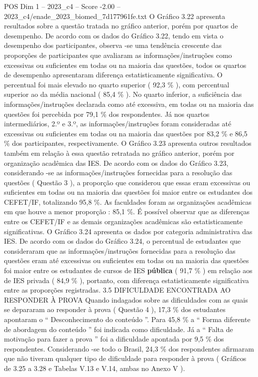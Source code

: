 \begin{textsample}{POS Dim 1 – 2023\_c4 – Score -2.00 – 2023\_c4/enade\_2023\_biomed\_7d177961fe.txt}
O Gráfico 3.22 apresenta resultados sobre a questão tratada no gráfico anterior, porém por quartos de desempenho.
De acordo com os dados do Gráfico 3.22, tendo em vista o desempenho dos participantes, observa -se uma tendência crescente das proporções de participantes que avaliaram as informações/instruções como excessivas ou suficientes em todas ou na maioria das questões, todos os quartos de desempenho apresentaram diferença estatisticamente significativa.
O percentual foi mais elevado no quarto superior ( 92,3 \% ), com percentual superior ao da média nacional ( 85,4 \% ).
No quarto inferior, a suficiência das informações/instruções declarada como até excessiva, em todas ou na maioria das questões foi percebida por 79,1 \% dos respondentes.
Já nos quartos intermediários, 2.º e 3.º, as informações/instruções foram consideradas até excessivas ou suficientes em todas ou na maioria das questões por 83,2 \% e 86,5 \% dos participantes, respectivamente.
O Gráfico 3.23 apresenta outros resultados também em relação à essa questão retratada no gráfico anterior, porém por organização acadêmica das IES.
De acordo com os dados do Gráfico 3.23, considerando -se as informações/instruções fornecidas para a resolução das questões ( Questão 3 ), a proporção que considerou que essas eram excessivas ou suficientes em todas ou na maioria das questões foi maior entre os estudantes dos CEFET/IF, totalizando 95,8 \%.
As faculdades foram as organizações acadêmicas em que houve a menor proporção : 85,1 \%.
É possível observar que as diferenças entre os CEFET/IF e as demais organizações acadêmicas são estatisticamente significativas.
O Gráfico 3.24 apresenta os dados por categoria administrativa das IES.
De acordo com os dados do Gráfico 3.24, o percentual de estudantes que consideraram que as informações/instruções fornecidas para a resolução das questões eram até excessivas ou suficientes em todas ou na maioria das questões foi maior entre os estudantes de cursos de IES \textbf{pública} ( 91,7 \% ) em relação aos de IES privada ( 84,9 \% ), portanto, com diferença estatisticamente significativa entre as proporções registradas. 3.5 DIFICULDADE ENCONTRADA AO RESPONDER À PROVA Quando indagados sobre as dificuldades com as quais se depararam ao responder à prova ( Questão 4 ), 17,3 \% dos estudantes apontaram o “ Desconhecimento do conteúdo ”.
Para 45,8 \% a “ Forma diferente de abordagem do conteúdo ” foi indicada como dificuldade.
Já a “ Falta de motivação para fazer a prova ” foi a dificuldade apontada por 9,5 \% dos respondentes.
Considerando -se todo o Brasil, 24,3 \% dos respondentes afirmaram que não tiveram qualquer tipo de dificuldade para responder à prova ( Gráficos de 3.25 a 3.28 e Tabelas V.13 e V.14, ambas no Anexo V ).

\end{textsample}

